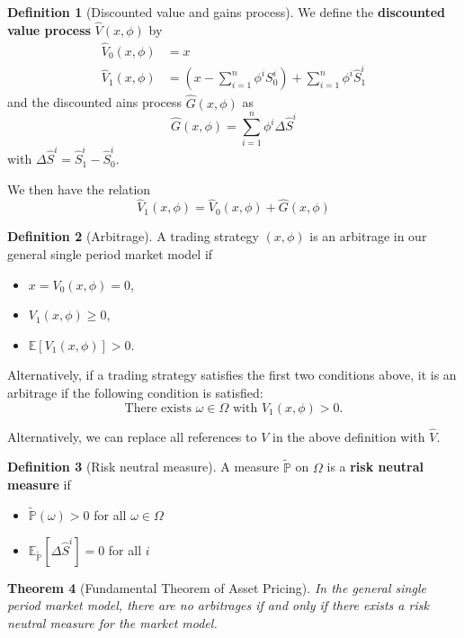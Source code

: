 \documentclass[10pt, oneside, reqno]{amsart}
\theoremstyle{plain}%
\newtheorem{thm}{Theorem}[subsection]
\theoremstyle{definition}
\newtheorem{defn}[thm]{Definition}
\theoremstyle{remark}
\newcommand{\expc}[1]{\mathbb{E}\left[#1\right]}
\newcommand{\sumni}{\sum_{i=1}^n}
\newcommand{\rnm}{\tilde{\mathbb{P}}}
\begin{document}
\begin{defn}[Discounted value and gains process]
We define the \textbf{discounted value process} $\hat{V}(x,\phi)$ by \begin{align*}
    \hat{V}_0 (x,\phi) &= x \\
    \hat{V}_1 (x,\phi) &= (x - \sumni \phi^i S^i_0) + \sumni \phi^i \hat{S}^i_1
\end{align*}
and the discounted ains process $\hat{G}(x,\phi)$ as \[
    \hat{G}(x,\phi) = \sumni \phi^i \Delta \hat{S}^i
\] with $\Delta \hat{S}^i = \hat{S}^i_1 - \hat{S}^i_0$.
\end{defn}

We then have the relation \[
    \hat{V}_1(x,\phi) = \hat{V}_0(x,\phi) + \hat{G}(x,\phi)
\]


\begin{defn}[Arbitrage]
    
    A trading strategy $(x,\phi)$ is an arbitrage in our general single period market model if
    \begin{itemize}
        \item $x = V_0(x,\phi) = 0$, 
        \item $V_1(x,\phi) \geq 0$,
        \item $\expc{V_1(x,\phi)} > 0$. 
    \end{itemize}
    
    Alternatively, if a trading strategy satisfies the first two conditions above, it is an arbitrage if the following condition is satisfied: \[
        \text{There exists } \omega \in \Omega \text{ with } V_1(x,\phi) > 0.
    \]

Alternatively, we can replace all references to $V$ in the above definition with $\hat{V}$.
\end{defn}

\begin{defn}[Risk neutral measure]
    A measure $\rnm$ on $\Omega$ is a \textbf{risk neutral measure} if 
    \begin{itemize}
        \item $\rnm(\omega) > 0$ for all $\omega \in \Omega$
        \item $\mathbb{E}_{\rnm} \left[\Delta \hat{S}^i \right] = 0$ for all $i$
    \end{itemize}
\end{defn}

\begin{thm}[Fundamental Theorem of Asset Pricing]
    In the general single period market model, there are no arbitrages if and only if there exists a risk neutral measure for the market model.
\end{thm}
\end{document}
